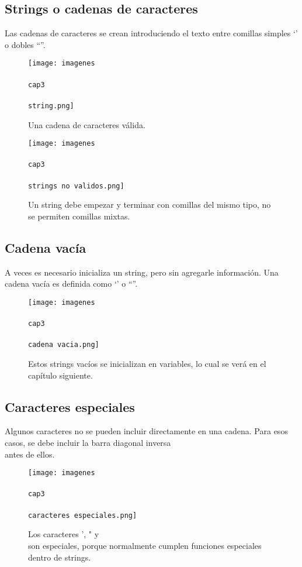 \documentclass{article}
\newcommand{\simple}[1]{`#1'}
\newcommand{\doble}[1]{``#1''}
\begin{document}
      \subsection{Strings o cadenas de caracteres}

        Las cadenas de caracteres se crean introduciendo el texto entre comillas simples \simple{} o dobles \doble{}.

        \begin{figure}[ht!]
          \texttt{[image: imagenes\\\\cap3\\\\string.png]}
          \caption{Una cadena de caracteres válida.}
        \end{figure}

        \begin{figure}[ht!]
          \texttt{[image: imagenes\\\\cap3\\\\strings no validos.png]}
          \caption{Un string debe empezar y terminar con comillas del mismo tipo, no se permiten comillas mixtas.}
        \end{figure}

      \subsection{Cadena vacía}

        A veces es necesario inicializa un string, pero sin agregarle información. Una cadena vacía es definida como \simple{} o \doble{}.

        \begin{figure}[ht!]
          \texttt{[image: imagenes\\\\cap3\\\\cadena vacia.png]}
          \caption{Estos strings vacíos se inicializan en variables, lo cual se verá en el capítulo siguiente.}
        \end{figure}

      \subsection{Caracteres especiales}

        Algunos caracteres no se pueden incluir directamente en una cadena. Para esos casos, se debe incluir la barra diagonal inversa \\ antes de ellos.

        \begin{figure}[ht!]
          \texttt{[image: imagenes\\\\cap3\\\\caracteres especiales.png]}
          \caption{Los caracteres ', " y \\ son especiales, porque normalmente cumplen funciones especiales dentro de strings.}
        \end{figure}
\end{document}
